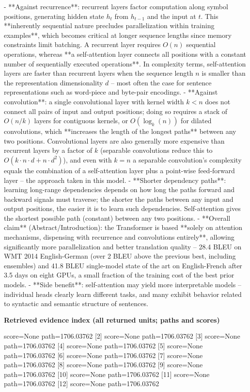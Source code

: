 \documentclass[10pt]{article}
\begin{document}
\begin{AnswerText}
- **Against recurrence**: recurrent layers factor computation along symbol positions, generating hidden state $h_t$ from $h_{t-1}$ and the input at $t$. This **inherently sequential nature precludes parallelization within training examples**, which becomes critical at longer sequence lengths since memory constraints limit batching. A recurrent layer requires $O(n)$ sequential operations, whereas **a self-attention layer connects all positions with a constant number of sequentially executed operations**. In complexity terms, self-attention layers are faster than recurrent layers when the sequence length $n$ is smaller than the representation dimensionality $d$ -- most often the case for sentence representations such as word-piece and byte-pair encodings.
- **Against convolution**: a single convolutional layer with kernel width $k<n$ does not connect all pairs of input and output positions; doing so requires a stack of $O(n/k)$ layers for contiguous kernels, or $O(\log_k(n))$ for dilated convolutions, which **increases the length of the longest paths** between any two positions. Convolutional layers are also generally more expensive than recurrent layers by a factor of $k$ (separable convolutions reduce this to $O(k\cdot n\cdot d + n\cdot d^2)$), and even with $k=n$ a separable convolution's complexity equals the combination of a self-attention layer plus a point-wise feed-forward layer -- the approach taken in this model.
- **Shorter dependency paths**: learning long-range dependencies depends on how long the paths forward and backward signals must traverse; the shorter the paths between any input and output positions, the easier it is to learn such dependencies. Self-attention gives the shortest possible path (constant) between any two positions.
- **Overall claim** (Abstract/Introduction): the Transformer is based **solely on attention mechanisms, dispensing with recurrence and convolutions entirely**, allowing significantly more parallelization and better translation quality -- 28.4 BLEU on WMT 2014 English-German (over 2 BLEU above the previous best, including ensembles) and 41.8 BLEU single-model state of the art on English-French after 3.5 days on eight GPUs, a small fraction of the training cost of the best prior models.
- **Side benefit**: self-attention may yield more interpretable models -- individual heads clearly learn different tasks, and many exhibit behavior related to syntactic and semantic structure of sentences.
\end{AnswerText}

\textbf{Retrieved evidence index (all returned units; paths and scores) }
\begin{EvidenceText}
[1] score=None path=1706.03762
[2] score=None path=1706.03762
[3] score=None path=1706.03762
[4] score=None path=1706.03762
[5] score=None path=1706.03762
[6] score=None path=1706.03762
[7] score=None path=1706.03762
[8] score=None path=1706.03762
[9] score=None path=1706.03762
[10] score=None path=1706.03762
[11] score=None path=1706.03762
[12] score=None path=1706.03762
\end{EvidenceText}
\end{document}

